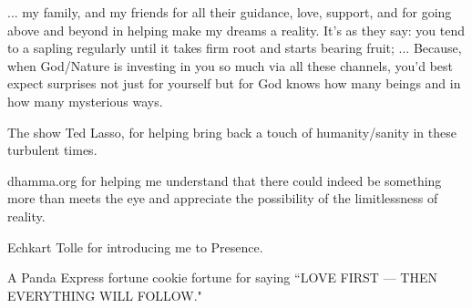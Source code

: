 ... my family, and my friends for all their guidance, love, support, and for going above and beyond in helping make my dreams a reality. It's as they say: you tend to a sapling regularly until it takes firm root and starts bearing fruit; ... Because, when God/Nature is investing in you so much via all these channels, you'd best expect surprises not just for yourself but for God knows how many beings and in how many mysterious ways.

The show Ted Lasso, for helping bring back a touch of humanity/sanity in these turbulent times.

dhamma.org for helping me understand that there could indeed be something more than meets the eye and appreciate the possibility of the limitlessness of reality.

Echkart Tolle for introducing me to Presence.

A Panda Express fortune cookie fortune for saying ``LOVE FIRST --- THEN EVERYTHING WILL FOLLOW."
